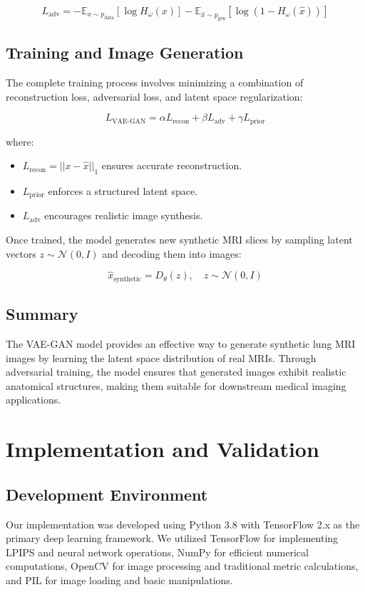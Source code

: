 \documentclass[a4paper,12pt]{article}
\begin{document}
\[
    L_{\text{adv}} = - \mathbb{E}_{x \sim p_{\text{data}}} [\log H_{\omega}(x)] - \mathbb{E}_{\hat{x} \sim p_{\text{gen}}} [\log (1 - H_{\omega}(\hat{x}))]
\]

\subsection{Training and Image Generation}
The complete training process involves minimizing a combination of reconstruction loss, adversarial loss, and latent space regularization:

\[
    L_{\text{VAE-GAN}} = \alpha L_{\text{recon}} + \beta L_{\text{adv}} + \gamma L_{\text{prior}}
\]

where:
\begin{itemize}
    \item \( L_{\text{recon}} = ||x - \hat{x}||_1 \) ensures accurate reconstruction.
    \item \( L_{\text{prior}} \) enforces a structured latent space.
    \item \( L_{\text{adv}} \) encourages realistic image synthesis.
\end{itemize}

Once trained, the model generates new synthetic MRI slices by sampling latent vectors \( z \sim \mathcal{N}(0, I) \) and decoding them into images:

\[
    \hat{x}_{\text{synthetic}} = D_{\theta}(z), \quad z \sim \mathcal{N}(0, I)
\]

\subsection{Summary}
The VAE-GAN model provides an effective way to generate synthetic lung MRI images by learning the latent space distribution of real MRIs. Through adversarial training, the model ensures that generated images exhibit realistic anatomical structures, making them suitable for downstream medical imaging applications.




\section{Implementation and Validation}

\subsection{Development Environment}
Our implementation was developed using Python 3.8 with TensorFlow 2.x as the primary deep learning framework. We utilized TensorFlow for implementing LPIPS and neural network operations, NumPy for efficient numerical computations, OpenCV for image processing and traditional metric calculations, and PIL for image loading and basic manipulations.
\end{document}
